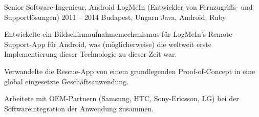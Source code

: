 \cvexperience
  {Senior Software-Ingenieur, Android}
  {LogMeIn (Entwickler von Fernzugriffs- und Supportlösungen)}
  {2011 -- 2014}
  {Budapest, Ungarn}
  {Java, Android, Ruby}
  {%
    \item Entwickelte ein Bildschirmaufnahmemechanismus für LogMeIn's Remote-Support-App für Android, was (möglicherweise) die weltweit erste Implementierung dieser Technologie zu dieser Zeit war.
    \item Verwandelte die Rescue-App von einem grundlegenden Proof-of-Concept in eine global eingesetzte Geschäftsanwendung.
    \item Arbeitete mit OEM-Partnern (Samsung, HTC, Sony-Ericsson, LG) bei der Softwareintegration der Anwendung zusammen.
  }
